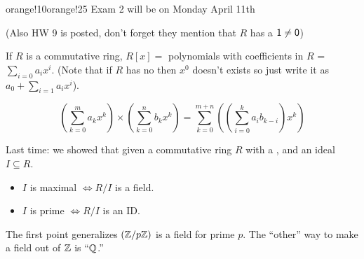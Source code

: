 \documentclass[notes.tex]{subfiles}
\begin{document}
\begin{classnote}{orange!10}{orange!25}
	Exam 2 will be on Monday April 11th

	(Also HW 9 is posted, don't forget they mention that $R$ has a $\mathsf{1}\ne\mathsf{0}$)
\end{classnote}

\begin{defn}
	If $R$ is a commutative ring, $R[x] = $ polynomials with coefficients in $R$ = $\sum_{i=0}a_ix^i$. (Note that if $R$ has no \one then $x^0$ doesn't exists so just write it as $a_0 + \sum_{i=1}a_ix^i$).
\end{defn}

\begin{property}
	\[
		\left(\sum_{k=0}^ma_kx^k\right)
		\times\left(\sum_{k=0}^nb_kx^k\right)
		= \sum_{k=0}^{m+n}\left(\left(\sum_{i=0}^ka_ib_{k-i}\right)x^k\right)
	\]
\end{property}

Last time: we showed that given a commutative ring $R$ with a \one, and an ideal $I\subseteq R$.
\begin{itemize}
	\item $I$ is maximal $\iff R/I$ is a field.
	\item $I$ is prime $\iff R/I$ is an ID.
\end{itemize}
The first point generalizes $(\mathbb{Z}/{p}\mathbb{Z})$ is a field for prime $p$.
The ``other'' way to make a field out of $\mathbb{Z}$ is ``$\mathbb{Q}$.''
\end{document}
